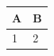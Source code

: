 \documentclass{article}
\begin{document}
\begin{tabular}{ll}
\toprule
A & B \\
\midrule
1 & 2 \\
\bottomrule
\end{tabular}
\end{document}
